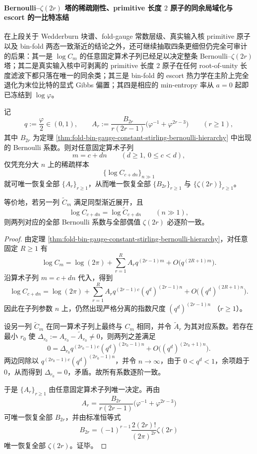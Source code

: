 \paragraph{Bernoulli--\texorpdfstring{$\zeta(2r)$}{zeta(2r)} 塔的稀疏刚性、primitive 长度 \texorpdfstring{$2$}{2} 原子的同余局域化与 escort 的一比特冻结}
在上段关于 Wedderburn 块谱、fold-gauge 常数层级、真实输入核 primitive 原子以及 bin-fold 两态一致渐近的结论之外，还可继续抽取四条更细但仍完全可审计的后果：其一是 \(\log C_m\) 的任意固定算术子列已经足以决定整条 Bernoulli--\(\zeta(2r)\) 塔；其二是真实输入核中可剥离的 primitive 长度 \(2\) 原子在任何 root-of-unity 长度滤波下都只落在唯一的同余类；其三是 bin-fold 的 escort 热力学在主阶上完全退化为末位比特的显式 Gibbs 偏置；其四是相应的 min-entropy 率从 \(a=0\) 起即已冻结到 \(\log\varphi\)。

\begin{theorem}\label{thm:gut-logCm-arithmetic-subsequence-rigidity}
记
\[
q:=\frac{\varphi}{2}\in(0,1),
\qquad
A_r:=\frac{B_{2r}}{r(2r-1)}\bigl(\varphi^{-1}+\varphi^{2r-3}\bigr)
\qquad (r\ge 1),
\]
其中 \(B_{2r}\) 为定理 \ref{thm:fold-bin-gauge-constant-stirling-bernoulli-hierarchy} 中出现的 Bernoulli 系数。则对任意固定算术子列
\[
m=c+dn\qquad(d\ge 1,\ 0\le c<d),
\]
仅凭充分大 \(n\) 上的稀疏样本
\[
\bigl\{\log C_{c+dn}\bigr\}_{n\gg 1}
\]
就可唯一恢复全部 \(\{A_r\}_{r\ge 1}\)，从而唯一恢复全部 \(\{B_{2r}\}_{r\ge 1}\) 与 \(\{\zeta(2r)\}_{r\ge 1}\)。

等价地，若另一列 \(\widetilde C_m\) 满足同型渐近展开，且
\[
\log C_{c+dn}=\log \widetilde C_{c+dn}\qquad(n\gg 1),
\]
则两列对应的全部 Bernoulli 系数与全部偶值 \(\zeta(2r)\) 必逐阶一致。
\end{theorem}
\begin{proof}
由定理 \ref{thm:fold-bin-gauge-constant-stirling-bernoulli-hierarchy}，对任意固定 \(R\ge 1\) 有
\[
\log C_m
=\log(2\pi)+\sum_{r=1}^{R}A_r q^{(2r-1)m}+O\!\bigl(q^{(2R+1)m}\bigr).
\]
沿算术子列 \(m=c+dn\) 代入，得到
\[
\log C_{c+dn}
=\log(2\pi)+\sum_{r=1}^{R}A_r q^{(2r-1)c}(q^d)^{(2r-1)n}
+O\!\bigl((q^d)^{(2R+1)n}\bigr).
\]
因此在子列参数 \(n\) 上，仍然出现严格分离的指数尺度
\(
(q^d)^{(2r-1)n}
\)
（\(r\ge 1\)）。

设另一列 \(\widetilde C_m\) 在同一算术子列上最终与 \(C_m\) 相同，并令 \(\widetilde A_r\) 为其对应系数。若存在最小 \(r_0\) 使 \(\Delta_{r_0}:=A_{r_0}-\widetilde A_{r_0}\neq 0\)，则两列之差满足
\[
0
=
\Delta_{r_0}q^{(2r_0-1)c}(q^d)^{(2r_0-1)n}
+O\!\bigl((q^d)^{(2r_0+1)n}\bigr).
\]
两边同除以 \(q^{(2r_0-1)c}(q^d)^{(2r_0-1)n}\)，并令 \(n\to\infty\)，由于 \(0<q^d<1\)，余项趋于 \(0\)，从而得到 \(\Delta_{r_0}=0\)，矛盾。故所有系数逐阶一致。

于是 \(\{A_r\}_{r\ge 1}\) 由任意固定算术子列唯一决定。再由
\[
A_r=\frac{B_{2r}}{r(2r-1)}\bigl(\varphi^{-1}+\varphi^{2r-3}\bigr)
\]
可唯一恢复全部 \(B_{2r}\)，并由标准恒等式
\[
B_{2r}=(-1)^{r-1}\frac{2(2r)!}{(2\pi)^{2r}}\zeta(2r)
\]
唯一恢复全部 \(\zeta(2r)\)。证毕。
\end{proof}

